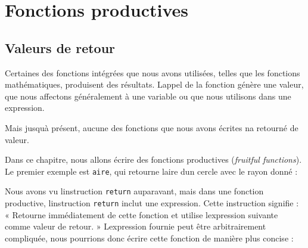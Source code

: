 \hypertarget{fonctions-productives}{%
\section{Fonctions productives}\label{fonctions-productives}}

\hypertarget{valeurs-de-retour}{%
\subsection{Valeurs de retour}\label{valeurs-de-retour}}

Certaines des fonctions intégrées que nous avons utilisées, telles que
les fonctions mathématiques, produisent des résultats.
L\textquotesingle appel de la fonction génère une valeur, que nous
affectons généralement à une variable ou que nous utilisons dans une
expression.

\begin{Shaded}
\begin{Highlighting}[]
\OperatorTok{=}\NormalTok{)}
\OperatorTok{=}\OperatorTok{*}
\end{Highlighting}
\end{Shaded}

Mais jusqu\textquotesingle à présent, aucune des fonctions que nous
avons écrites n\textquotesingle a retourné de valeur.

Dans ce chapitre, nous allons écrire des fonctions productives
(\emph{fruitful functions}). Le premier exemple est \texttt{aire}, qui
retourne l\textquotesingle aire d\textquotesingle un cercle avec le
rayon donné :

\begin{Shaded}
\begin{Highlighting}[]

\OperatorTok{=}\OperatorTok{*}\OperatorTok{**}
\end{Highlighting}
\end{Shaded}

Nous avons vu l\textquotesingle instruction \texttt{return} auparavant,
mais dans une fonction productive, l\textquotesingle instruction
\texttt{return} inclut une expression. Cette instruction signifie : «
Retourne immédiatement de cette fonction et utilise
l\textquotesingle expression suivante comme valeur de retour. »
L\textquotesingle expression fournie peut être arbitrairement
compliquée, nous pourrions donc écrire cette fonction de manière plus
concise :

